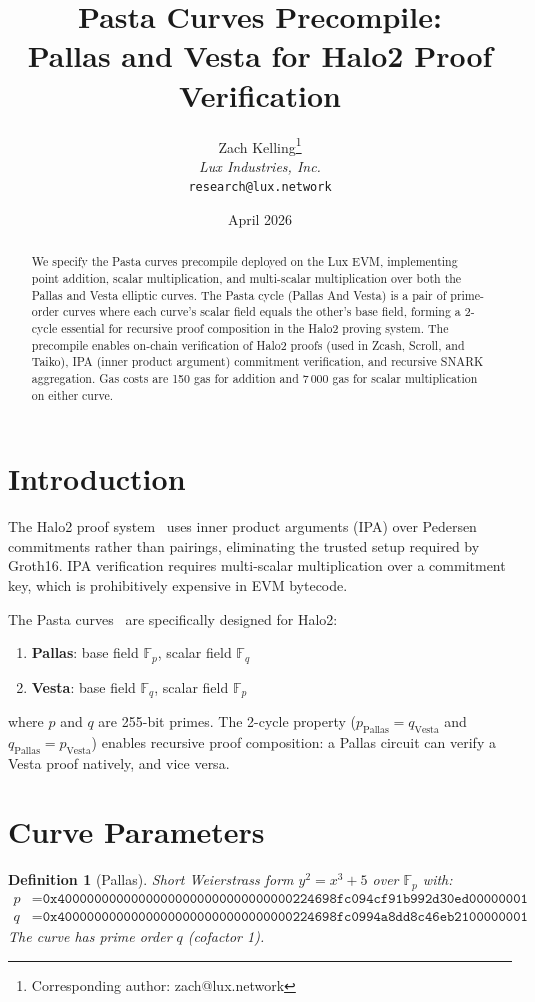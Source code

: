 \documentclass[11pt,a4paper]{article}
\title{Pasta Curves Precompile:\\Pallas and Vesta for Halo2 Proof Verification}
\author{
Zach Kelling\thanks{Corresponding author: zach@lux.network}\\
\textit{Lux Industries, Inc.}\\
\texttt{research@lux.network}
}
\date{April 2026}
\newtheorem{definition}{Definition}
\begin{document}
\luxcoverpage

\begin{abstract}
We specify the Pasta curves precompile deployed on the Lux EVM, implementing
point addition, scalar multiplication, and multi-scalar multiplication over both
the Pallas and Vesta elliptic curves. The Pasta cycle (Pallas And Vesta)
is a pair of prime-order curves where each curve's scalar field equals the other's
base field, forming a 2-cycle essential for recursive proof composition in the
Halo2 proving system. The precompile enables on-chain verification of
Halo2 proofs (used in Zcash, Scroll, and Taiko), IPA (inner product argument)
commitment verification, and recursive SNARK aggregation. Gas costs are 150 gas
for addition and 7\,000 gas for scalar multiplication on either curve.
\end{abstract}

\section{Introduction}

The Halo2 proof system~\cite{halo2} uses inner product arguments (IPA) over
Pedersen commitments rather than pairings, eliminating the trusted setup required
by Groth16. IPA verification requires multi-scalar multiplication over a
commitment key, which is prohibitively expensive in EVM bytecode.

The Pasta curves~\cite{pasta} are specifically designed for Halo2:
\begin{enumerate}[label=(\roman*)]
  \item \textbf{Pallas}: base field $\mathbb{F}_p$, scalar field $\mathbb{F}_q$
  \item \textbf{Vesta}: base field $\mathbb{F}_q$, scalar field $\mathbb{F}_p$
\end{enumerate}
where $p$ and $q$ are 255-bit primes. The 2-cycle property ($p_{\text{Pallas}} = q_{\text{Vesta}}$
and $q_{\text{Pallas}} = p_{\text{Vesta}}$) enables recursive proof composition:
a Pallas circuit can verify a Vesta proof natively, and vice versa.

\section{Curve Parameters}

\begin{definition}[Pallas]
Short Weierstrass form $y^2 = x^3 + 5$ over $\mathbb{F}_p$ with:
\begin{align}
  p &= \texttt{0x40000000000000000000000000000000224698fc094cf91b992d30ed00000001} \\
  q &= \texttt{0x40000000000000000000000000000000224698fc0994a8dd8c46eb2100000001}
\end{align}
The curve has prime order $q$ (cofactor 1).
\end{definition}
\end{document}
